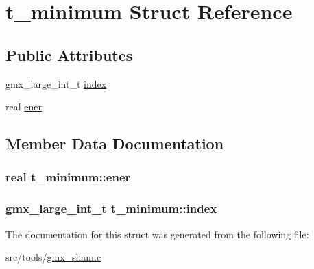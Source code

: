 \hypertarget{structt__minimum}{\section{t\-\_\-minimum \-Struct \-Reference}
\label{structt__minimum}
}
\subsection*{\-Public \-Attributes}
\begin{DoxyCompactItemize}
\item 
gmx\-\_\-large\-\_\-int\-\_\-t \hyperlink{structt__minimum_af2e8a54553e611eaec743961c31f69d4}{index}
\item 
real \hyperlink{structt__minimum_a8ddf6475394967c0c5ebeb0e76d26506}{ener}
\end{DoxyCompactItemize}


\subsection{\-Member \-Data \-Documentation}
\hypertarget{structt__minimum_a8ddf6475394967c0c5ebeb0e76d26506}{
\subsubsection[{ener}]{\setlength{\rightskip}{0pt plus 5cm}real {\bf t\-\_\-minimum\-::ener}}}\label{structt__minimum_a8ddf6475394967c0c5ebeb0e76d26506}
\hypertarget{structt__minimum_af2e8a54553e611eaec743961c31f69d4}{
\subsubsection[{index}]{\setlength{\rightskip}{0pt plus 5cm}gmx\-\_\-large\-\_\-int\-\_\-t {\bf t\-\_\-minimum\-::index}}}\label{structt__minimum_af2e8a54553e611eaec743961c31f69d4}


\-The documentation for this struct was generated from the following file\-:\begin{DoxyCompactItemize}
\item 
src/tools/\hyperlink{gmx__sham_8c}{gmx\-\_\-sham.\-c}\end{DoxyCompactItemize}
